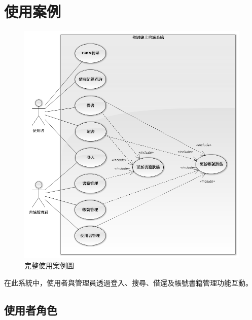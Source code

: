 \chapter{使用案例}

\begin{figure}[ht]
    \centering
    \includegraphics[width=\linewidth]{image/使用案例.png}
    \captionsetup{justification=centering}
    \caption{完整使用案例圖}
\end{figure}

在此系統中，使用者與管理員透過登入、搜尋、借還及帳號書籍管理功能互動。

\clearpage

\section{使用者角色}

